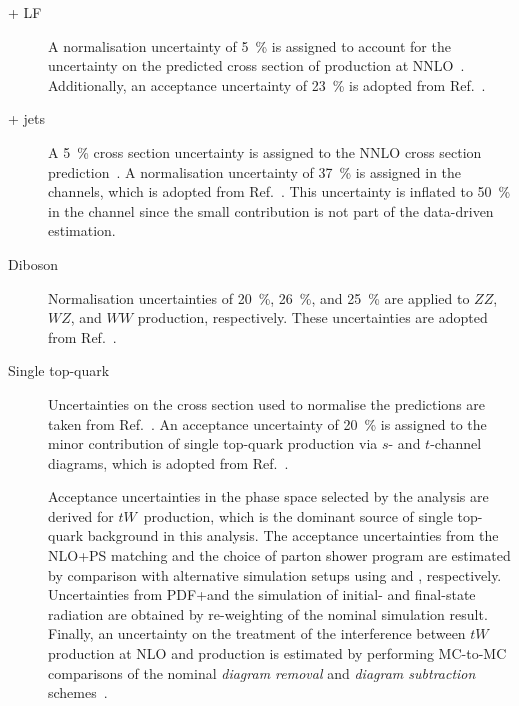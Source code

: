 \begin{description}

\item[\PZ + LF] A normalisation uncertainty of \SI{5}{\percent} is assigned to
  account for the uncertainty on the predicted cross section of \Zjets
  production at NNLO~\cite{Anastasiou:2003ds}. Additionally, an acceptance
  uncertainty of \SI{23}{\percent} is adopted from Ref.~\cite{HIGG-2018-51}.

\item[\PW + jets] A \SI{5}{\percent} cross section uncertainty is assigned to
  the NNLO cross section prediction~\cite{Anastasiou:2003ds}. A normalisation
  uncertainty of \SI{37}{\percent} is assigned in the \lephad channels, which is
  adopted from Ref.~\cite{HIGG-2018-51}. This uncertainty is inflated to
  \SI{50}{\percent} in the \hadhad channel since the small \Wjets contribution
  is not part of the data-driven \faketauhadvis estimation.

\item[Diboson] Normalisation uncertainties of \SI{20}{\percent},
  \SI{26}{\percent}, and \SI{25}{\percent} are applied to $ZZ$, $WZ$, and $WW$
  production, respectively. These uncertainties are adopted from
  Ref.~\cite{HIGG-2018-51}.

\item[Single top-quark] Uncertainties on the cross section used to normalise the
  predictions are taken from Ref.~\cite{stopxsec}. An acceptance uncertainty of
  \SI{20}{\percent} is assigned to the minor contribution of single top-quark
  production via $s$- and $t$-channel diagrams, which is adopted from
  Ref.~\cite{HIGG-2018-51}.

  Acceptance uncertainties in the phase space selected by the analysis are
  derived for $tW$~production, which is the dominant source of single top-quark
  background in this analysis. The acceptance uncertainties from the NLO+PS
  matching and the choice of parton shower program are estimated by comparison
  with alternative simulation setups using \MGNLO and \HERWIG[7],
  respectively. Uncertainties from PDF+\alphas and the simulation of initial-
  and final-state radiation are obtained by re-weighting of the nominal
  simulation result. Finally, an uncertainty on the treatment of the
  interference between $tW$ production at NLO and \ttbar production is estimated
  by performing MC-to-MC comparisons of the nominal \emph{diagram removal} and
  \emph{diagram subtraction} schemes~\cite{Frixione:2008yi}.


\end{description}
